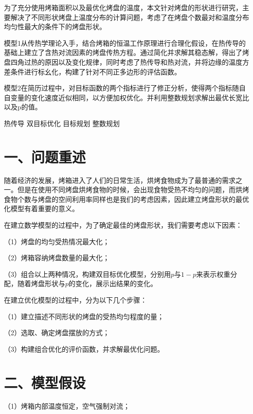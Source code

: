 \documentclass{my_paper}
\begin{document}
\newpage
\begin{center}
    \zhaiyao
\end{center}

为了充分使用烤箱面积以及最优化烤盘的温度，本文针对烤盘的形状进行研究，主要解决了不同形状烤盘上温度分布的计算问题，考虑了在烤盘个数最对和温度分布均匀性最大的条件下的烤盘形状。

模型1从传热学理论入手，结合烤箱的恒温工作原理进行合理化假设，在热传导的基础上建立了含热对流因素的烤盘传热方程。通过简化并求解其稳态解，得出了烤盘四角过热的原因以及变化规律，同时考虑了热传导和热对流，并将边缘的温度方差条件进行标幺化，构建了针对不同正多边形的评估函数。

模型2在简历过程中，对目标函数的两个指标进行了修正分析，使得两个指标随自自变量的变化速度近似相同，以方便加权优化。并利用整数规划求解出最优长宽比以及p的值。

\begin{guanjianci}
    热传导 \quad 双目标优化 \quad 目标规划 \quad 整数规划
\end{guanjianci}

\vspace{2em}

\tableofcontents

\newpage
\section{一、问题重述}
随着经济的发展，烤箱进入了人们的日常生活，烘烤食物成为了最普通的需求之一。但是在使用不同烤盘烘烤食物的时候，会出现食物受热不均匀的问题，而烘烤食物个数与烤盘的空间利用率同样也是我们的考虑因素，因此建立烤盘形状的最优化模型有着重要的意义。

在建立数学模型的过程中，为了确定最佳的烤盘形状，我们需要考虑以下因素：

（1）烤盘的均匀受热情况最大化；

（2）烤箱容纳烤盘数量的最大化；

（3）组合以上两种情况，构建双目标优化模型，分别用$p$与$1-p$来表示权重分配，随着烤盘形状与$p$的变化，展示出结果的变化。

在建立优化模型的过程中，分为以下几个步骤：

（1）建立描述不同形状的烤盘的受热均匀程度的量；

（2）选取、确定烤盘摆放的方式；

（3）构建组合优化的评价函数，并求解最优化问题。

\section{二、模型假设}
（1）烤箱内部温度恒定，空气强制对流；
\end{document}
